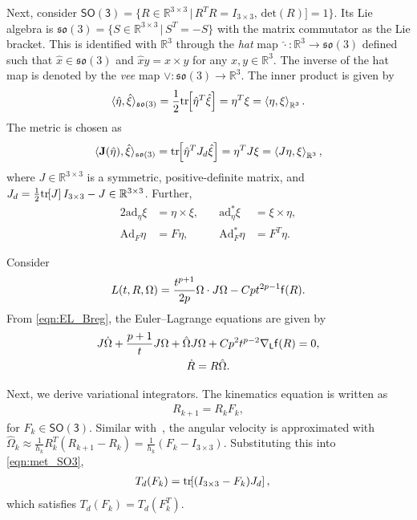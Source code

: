 \documentclass[letterpaper, 10pt, conference]{ieeeconf}
\newcommand{\bracket}[1]{\ensuremath{\left[ #1 \right]}}
\newcommand{\tr}[1]{\mbox{tr}\ensuremath{\negthickspace\bracket{#1}}}
\newcommand{\SO}{\ensuremath{\mathsf{SO(3)}}}
\renewcommand{\L}{\ensuremath{\mathsf{L}}}
\newcommand{\so}{\ensuremath{\mathfrak{so}(3)}}
\renewcommand{\Re}{\ensuremath{\mathbb{R}}}
\newcommand{\pair}[1]{\ensuremath{\left\langle #1 \right\rangle}}
\newcommand{\Ad}{\ensuremath{\mathrm{Ad}}}
\newcommand{\ad}{\ensuremath{\mathrm{ad}}}
\begin{document}
Next, consider $\SO=\{R\in\Re^{3\times 3}\,|\, R^T R = I_{3\times 3},\, \mathrm{det}(R)]=1\}$.
Its Lie algebra is $\so=\{S\in\Re^{3\times 3}\,|\, S^T=-S\}$ with the matrix commutator as the Lie bracket. 
This is identified with $\Re^3$ through the \textit{hat} map $\hat\cdot :\Re^3\rightarrow\so$ defined such that $\hat x\in\so$ and $\hat x y = x\times y$ for any $x,y\in\Re^3$.
The inverse of the hat map is denoted by the \textit{vee} map $\vee: \so\rightarrow\Re^3$.
The inner product is given by
\begin{align*}
    \langle \hat \eta, \hat \xi \rangle_{\so} = \frac{1}{2}\tr{\hat \eta^T\hat \xi} = \eta^T\xi = \pair{\eta,\xi}_{\Re^3}.
\end{align*}
The metric is chosen as
\begin{align}
    \langle \mathbf{J}(\hat \eta), \hat \xi \rangle_{\so} = \tr{\hat \eta^T J_d \hat \xi} = \eta^TJ \xi = \pair{J\eta,\xi}_{\Re^3},\label{eqn:met_SO3}
\end{align}
where $J\in\Re^{3\times 3}$ is a symmetric, positive-definite matrix, and $J_d=\frac{1}{2}\tr{J}I_{3\times 3}-J\in\Re^{3\times 3}$.
Further, 
\begin{alignat*}{2}
    \ad_\eta\xi &= \eta\times \xi,& \quad \ad^*_\eta \xi &= \xi\times \eta,\\
    \Ad_F\eta &= F\eta,& \quad \Ad^*_F \eta &= F^T\eta.
\end{alignat*}

Consider
\begin{align*}
    L(t,R,\Omega) = \frac{t^{p+1}}{2p} \Omega\cdot J\Omega - Cpt^{2p-1} \mathsf{f}(R).
\end{align*}
From \eqref{eqn:EL_Breg}, the Euler--Lagrange equations are given by
\begin{gather}
    J\dot\Omega + \frac{p+1}{t} J\Omega + \hat\Omega J\Omega + C p^2 t^{p-2} \nabla_\L \obj(R) = 0,\label{eqn:EL_SO3}\\
    \dot R = R\hat\Omega. \label{eqn:R_dot}
\end{gather}

Next, we derive variational integrators. 
The kinematics equation is written as
\begin{align}
    R_{k+1} = R_k F_k, \label{eqn:Rkp}
\end{align}
for $F_k\in\SO$.
Similar with~\cite{LeeLeoCMAME07}, the angular velocity is approximated with $\hat\Omega_k \approx \frac{1}{h_k} R_k^T (R_{k+1}-R_k) = \frac{1}{h_k} (F_k-I_{3\times 3})$.
Substituting this into \eqref{eqn:met_SO3},
\begin{align}
    T_d(F_k) & =\tr{(I_{3\times 3}-F_k)J_d}, \label{eqn:Td_SO3}
\end{align}
which satisfies $T_d(F_k)=T_d(F_k^T)$.
\end{document}
